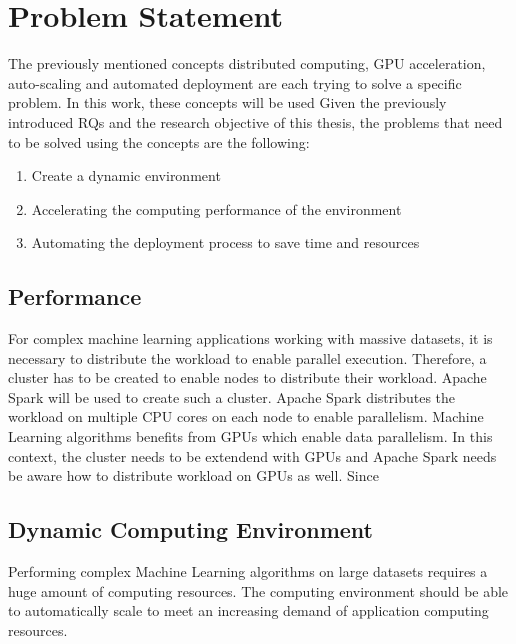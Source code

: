 \section{Problem Statement}
\label{sec:01_introduction_problem}
%
%

The previously mentioned concepts distributed computing, GPU acceleration, auto-scaling and automated deployment are each trying to solve a specific problem.
In this work, these concepts will be used 
Given the previously introduced RQs and the research objective of this thesis, the problems that need to be solved using the concepts are the following:
\begin{enumerate}
\item Create a dynamic environment
\item Accelerating the computing performance of the environment
\item Automating the deployment process to save time and resources
\end{enumerate}

\subsection{Performance}
For complex machine learning applications working with massive datasets, it is necessary to distribute the workload to enable parallel execution. Therefore, a cluster has to be created to enable nodes to distribute their workload. Apache Spark will be used to create such a cluster.
Apache Spark distributes the workload on multiple CPU cores on each node to enable parallelism. Machine Learning algorithms benefits from GPUs which enable data parallelism. In this context, the cluster needs to be extendend with GPUs and Apache Spark needs be aware how to distribute workload on GPUs as well.
Since 


\subsection{Dynamic Computing Environment}
Performing complex Machine Learning algorithms on large datasets requires a huge amount of computing resources.
The computing environment should be able to automatically scale to meet an increasing demand of application computing resources.



